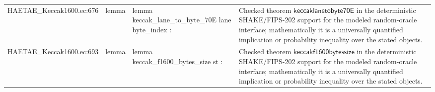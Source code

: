 \documentclass[10pt]{article}
\begin{document}
\begin{longtable}{L{0.11\textwidth}L{0.055\textwidth}L{0.385\textwidth}L{0.41\textwidth}}
HAETAE\_\allowbreak{}Keccak1600.\allowbreak{}ec:\allowbreak{}676 & lemma & {\ttfamily\scriptsize lemma keccak\_\allowbreak{}lane\_\allowbreak{}to\_\allowbreak{}byte\_\allowbreak{}70E lane byte\_\allowbreak{}index :} & Checked theorem $\mathsf{keccaklanetobyte70E}$ in the deterministic SHAKE/FIPS-202 support for the modeled random-oracle interface; mathematically it is a universally quantified implication or probability inequality over the stated objects. \\
HAETAE\_\allowbreak{}Keccak1600.\allowbreak{}ec:\allowbreak{}693 & lemma & {\ttfamily\scriptsize lemma keccak\_\allowbreak{}f1600\_\allowbreak{}bytes\_\allowbreak{}size st :} & Checked theorem $\mathsf{keccakf1600bytessize}$ in the deterministic SHAKE/FIPS-202 support for the modeled random-oracle interface; mathematically it is a universally quantified implication or probability inequality over the stated objects. \\
\bottomrule
\end{longtable}
\end{document}
